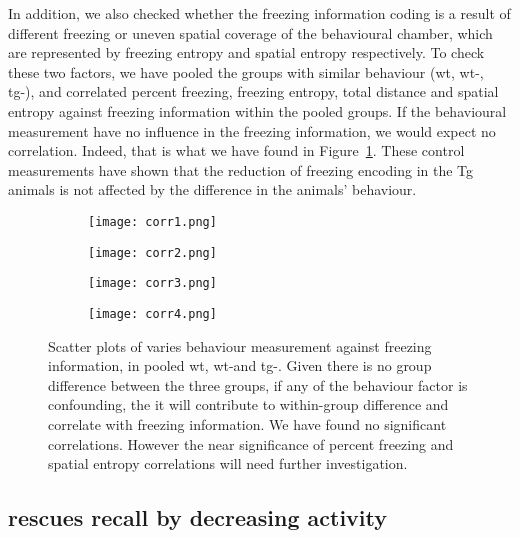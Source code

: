 In addition, we also checked whether the freezing information coding is a result of different freezing or uneven spatial coverage of the behavioural chamber, which are represented by freezing entropy and spatial entropy respectively. To check these two factors, we have pooled the groups with similar behaviour (\gls{wt}, \gls{wt}-\tglu, \gls{tg}-\tglu), and correlated percent freezing, freezing entropy, total distance and spatial entropy against freezing information within the pooled groups. If the behavioural measurement have no influence in the freezing information, we would expect no correlation. Indeed, that is what we have found in Figure~\ref{f.ad.corrs}. These control measurements have shown that the reduction of freezing encoding in the Tg animals is not affected by the difference in the animals' behaviour.
\begin{figure}[h]
    \begin{subfigure}[t]{.5\textwidth}
        \texttt{[image: corr1.png]}
        \caption{}
    \end{subfigure}
    \begin{subfigure}[t]{.5\textwidth}
        \texttt{[image: corr2.png]}
        \caption{}
    \end{subfigure}
    \begin{subfigure}[t]{.5\textwidth}
        \texttt{[image: corr3.png]}
        \caption{}
    \end{subfigure}
    \begin{subfigure}[t]{.5\textwidth}
        \texttt{[image: corr4.png]}
        \caption{}
    \end{subfigure}
    \caption{Scatter plots of varies behaviour measurement against freezing information, in pooled \gls{wt}, \gls{wt}-\glu and \gls{tg}-\glu. Given there is no group difference between the three groups, if any of the behaviour factor is confounding, the it will contribute to within-group difference and correlate with freezing information. We have found no significant correlations. However the near significance of percent freezing and spatial entropy correlations will need further investigation. \label{f.ad.corrs}}
\end{figure}


\subsection{\tglu rescues recall by decreasing activity}

